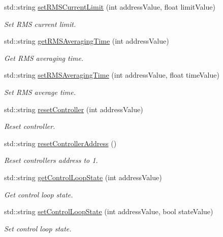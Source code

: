 \begin{DoxyCompactItemize}
std\+::string \hyperlink{namespaceconex_a3552f23ef324fc207a4b8ea8ca79d63c}{set\+R\+M\+S\+Current\+Limit} (int address\+Value, float limit\+Value)
\begin{DoxyCompactList}\small\item\em Set R\+MS current limit. \end{DoxyCompactList}\item 
std\+::string \hyperlink{namespaceconex_a7c219ac12ae0d8c2385cbf3ef5aa2ed2}{get\+R\+M\+S\+Averaging\+Time} (int address\+Value)
\begin{DoxyCompactList}\small\item\em Get R\+MS averaging time. \end{DoxyCompactList}\item 
std\+::string \hyperlink{namespaceconex_a4db096ebf48bf2512a51c6f16f6d05a5}{set\+R\+M\+S\+Averaging\+Time} (int address\+Value, float time\+Value)
\begin{DoxyCompactList}\small\item\em Set R\+MS average time. \end{DoxyCompactList}\item 
std\+::string \hyperlink{namespaceconex_ac817039b6d386eae2ff9b288bee8c8f6}{reset\+Controller} (int address\+Value)
\begin{DoxyCompactList}\small\item\em Reset controller. \end{DoxyCompactList}\item 
std\+::string \hyperlink{namespaceconex_a4dd4ee5bd3729fc3cbf6e6f70f141baf}{reset\+Controller\+Address} ()
\begin{DoxyCompactList}\small\item\em Reset controller\textquotesingle{}s address to 1. \end{DoxyCompactList}\item 
std\+::string \hyperlink{namespaceconex_a50aafea583b1e9883f5c9da70f84e572}{get\+Control\+Loop\+State} (int address\+Value)
\begin{DoxyCompactList}\small\item\em Get control loop state. \end{DoxyCompactList}\item 
std\+::string \hyperlink{namespaceconex_a617d632120418b5c8f501221c4b3c4e7}{set\+Control\+Loop\+State} (int address\+Value, bool state\+Value)
\begin{DoxyCompactList}\small\item\em Set control loop state. \end{DoxyCompactList}\item 

\end{DoxyCompactItemize}
